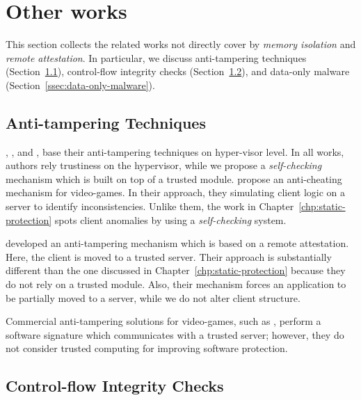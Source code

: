 \section{Other works}
\label{sec:miscellansous}

This section collects the related works not directly cover by \emph{memory 
isolation} and \emph{remote attestation}.
In particular, we discuss anti-tampering techniques 
(Section~\ref{ssec:anti-tampering-techniques}), control-flow integrity checks 
(Section~\ref{ssec:control-flow-integrity-checks}), and data-only malware 
(Section~\ref{ssec:data-only-malware}).

\subsection{Anti-tampering Techniques}
\label{ssec:anti-tampering-techniques}

\cite{7371862}, \cite{ghosh2010secure}, and 
\cite{Dewan:2008:HSP:1400549.1400685}, base their anti-tampering techniques 
on hyper-visor level. 
In all works, authors rely trustiness on the hypervisor, while we propose a 
\emph{self-checking} mechanism which is built on top of a trusted module.
\cite{Feng:2008:SMC:1517494.1517497} propose an anti-cheating mechanism for 
video-games. In their approach, they simulating client logic on a server to 
identify inconsistencies.
Unlike them, the work in Chapter~\ref{chp:static-protection} spots client 
anomalies by using a \emph{self-checking} system.

\cite{viticchie2016reactive} developed an anti-tampering mechanism which is 
based on a remote attestation.
Here, the client is moved to a trusted server.
Their approach is substantially different than the one discussed in 
Chapter~\ref{chp:static-protection} because they do not rely on a trusted 
module.
Also, their mechanism forces an application to be partially moved to a server, 
while we do not alter client structure.

Commercial anti-tampering solutions for video-games, such 
as \citep{evenbalance,vac}, perform a software signature which communicates 
with a trusted server; however, they do not consider trusted computing for 
improving software protection.

\subsection{Control-flow Integrity Checks}
\label{ssec:control-flow-integrity-checks}

